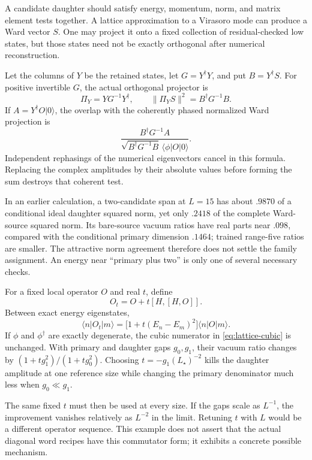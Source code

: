 A candidate daughter should satisfy energy, momentum, norm, and matrix
element tests together. A lattice approximation to a Virasoro mode can
produce a Ward vector $S$. One may project it onto a fixed collection
of residual-checked low states, but those states need not be exactly
orthogonal after numerical reconstruction.

Let the columns of $Y$ be the retained states, let
$G=Y^\dagger Y$, and put $B=Y^\dagger S$. For positive invertible
$G$, the actual orthogonal projector is
\[
 \Pi_Y=Y G^{-1}Y^\dagger,
 \qquad \|\Pi_YS\|^2=B^\dagger G^{-1}B.
\]
If $A=Y^\dagger O|0\rangle$, the overlap with the coherently phased
normalized Ward projection is
\[
 \frac{B^\dagger G^{-1}A}
 {\sqrt{B^\dagger G^{-1}B}\,\langle\phi|O|0\rangle}.
\]
Independent rephasings of the numerical eigenvectors cancel in this
formula. Replacing the complex amplitudes by their absolute values
before forming the sum destroys that coherent test.

In an earlier calculation, a two-candidate span at $L=15$
has about $.9870$ of a conditional ideal daughter squared norm, yet only
$.2418$ of the complete Ward-source squared norm. Its bare-source vacuum
ratios have real parts near $.098$, compared with the conditional
primary dimension $.1464$; trained range-five ratios are smaller.
The attractive norm agreement therefore does not settle the family
assignment. An energy near ``primary plus two'' is only one of several
necessary checks.

\begin{example}
For a fixed local operator $O$ and real $t$, define
\[
 O_t=O+t[H,[H,O]].
\]
Between exact energy eigenstates,
\[
 \langle n|O_t|m\rangle
 =\bigl[1+t(E_n-E_m)^2\bigr]\langle n|O|m\rangle.
\]
If $\phi$ and $\phi^\dagger$ are exactly degenerate, the cubic
numerator in \eqref{eq:lattice-cubic} is unchanged. With primary and
daughter gaps $g_0,g_1$, their vacuum ratio changes by
$(1+tg_1^2)/(1+tg_0^2)$. Choosing $t=-g_1(L_\star)^{-2}$ kills the
daughter amplitude at one reference size while changing the primary
denominator much less when $g_0\ll g_1$.

The same fixed $t$ must then be used at every size. If the gaps scale
as $L^{-1}$, the improvement vanishes relatively as $L^{-2}$ in the
limit. Retuning $t$ with $L$ would be a different operator sequence.
This example does not assert that the actual diagonal word recipes
have this commutator form; it exhibits a concrete possible mechanism.
\end{example}

